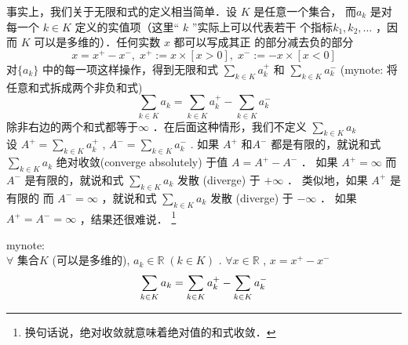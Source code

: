 事实上，我们关于无限和式的定义相当简单．设 $ K $  是任意一个集合，
而$ a_k $  是对每一个 $ k\in K $ 定义的实值项（这里“ $ k $  ”实际上可以代表若干
个指标$ k_1,k_2,\dots $  ，因而 $ K $ 可以是多维的）．任何实数 $ x $ 都可以写成其正
的部分减去负的部分
\begin{equation*}
    x=x^+-x^-,\; x^+:= x\times [x>0],\; x^- := -x\times [x<0]
\end{equation*}
对$ \{a_k\} $ 中的每一项这样操作，得到无限和式 $ \sum_{k\in K}a_k^+ $ 和 $ \sum_{k\in K}a_k^- $ (mynote: 将任意和式拆成两个非负和式)
\begin{equation}
     \sum_{k\in K}a_k =  \sum_{k\in K}a_k^+ -  \sum_{k\in K}a_k^-
\end{equation}
除非右边的两个和式都等于$ \infty $  ．在后面这种情形，我们不定义 $ \sum_{k\in K}a_k  $ \\
设 
$ A^+ = \sum_{k\in K}a_k^+  $ , 
$ A^- = \sum_{k\in K}a_k^-  $ . 
如果 $ A^+ $ 和$ A^- $ 都是有限的，就说和式 $ \sum_{k\in K}a_k  $ 绝对收敛(converge absolutely) 于值 $ A= A^+-A^- $ ．
如果 $ A^+=\infty $ 而 $ A^- $ 是有限的，就说和式 $ \sum_{k\in K}a_k  $ 发散 (diverge) 于 $ +\infty $ ．
类似地，如果 $ A^+ $ 是有限的 而 $ A^-=\infty $ ，就说和式 $ \sum_{k\in K}a_k  $ 发散 (diverge) 于 $ -\infty $ ．
如果 $ A^+ = A^-=\infty $ ，结果还很难说．
\footnote{换句话说，绝对收敛就意味着绝对值的和式收敛．}

mynote:\\
$ \forall $ 集合$ K $ (可以是多维的), $ a_k\in \mathbb{R} \;(k\in K) $ . $ \forall x\in\mathbb{R} $ , $ x = x^+-x^- $ 
\begin{equation*}
    \sum_{k\in K}a_k = \sum_{k\in K}\tikznode{ak1}{$ a_k^+ $ } - \sum_{k\in K}\tikznode{ak2}{$ a_k^- $ }
\end{equation*}


